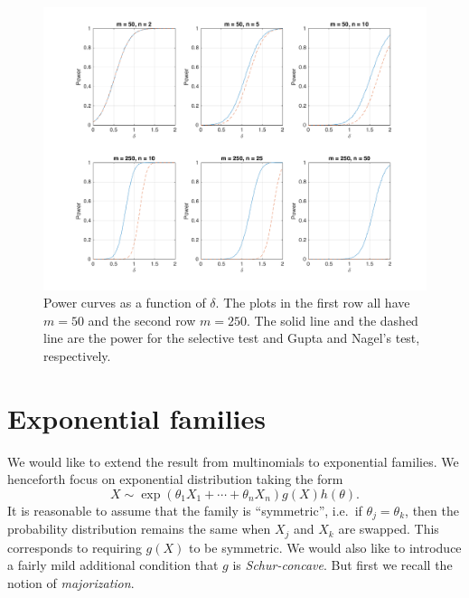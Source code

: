 \documentclass[11pt]{article}
\begin{document}
\begin{figure}[htbp]
\begin{center}
\includegraphics[width = \textwidth]{plotMultinomialPower}
\end{center}
\caption{Power curves as a function of $\delta$. The plots in the first row all have $m = 50$ and the second row $m = 250$. The solid line and the dashed line are the power for the selective test and Gupta and Nagel's test, respectively.}
\label{fig:power}
\end{figure}

\section{Exponential families}
\label{sec:exponential_families}

We would like to extend the result from multinomials to exponential families. We henceforth focus on exponential distribution taking the form
\begin{equation}
X \sim \exp\left(\theta_1 X_1 + \cdots + \theta_n X_n\right) g\left(X\right) h\left(\theta\right).
\label{eqn:exp_family}
\end{equation}
It is reasonable to assume that the family is ``symmetric'', i.e.\ if $\theta_j = \theta_k$, then the probability distribution remains the same when $X_j$ and $X_k$ are swapped. This corresponds to requiring $g\left(X\right)$ to be symmetric. We would also like to introduce a fairly mild additional condition that $g$ is {\em Schur-concave}. But first we recall the notion of {\em majorization}.
\end{document}
